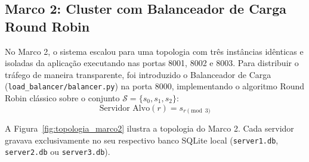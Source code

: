 \documentclass[12pt,a4paper]{article}
\begin{document}
	\subsection{Marco 2: Cluster com Balanceador de Carga Round Robin}
	No Marco 2, o sistema escalou para uma topologia com três instâncias idênticas e isoladas da aplicação executando nas portas 8001, 8002 e 8003. Para distribuir o tráfego de maneira transparente, foi introduzido o Balanceador de Carga (\texttt{load\_balancer/balancer.py}) na porta 8000, implementando o algoritmo Round Robin clássico sobre o conjunto $\mathcal{S} = \{s_0, s_1, s_2\}$:
	\begin{equation}
		\text{Servidor Alvo}(r) = s_{r \pmod 3}
	\end{equation}
	
	A Figura~\ref{fig:topologia_marco2} ilustra a topologia do Marco 2. Cada servidor gravava exclusivamente no seu respectivo banco SQLite local (\texttt{server1.db}, \texttt{server2.db} ou \texttt{server3.db}).
	
\end{document}
